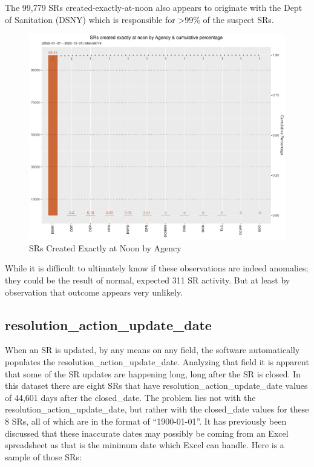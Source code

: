 \documentclass[12pt, titlepage]{article}
\begin{document}
{	The 99,779 SRs created-exactly-at-noon also appears to originate with the Dept of Sanitation (DSNY) which
	is responsible for \textgreater{}99\% of the suspect SRs.
	
	\begin{figure}[H]
		 \centering
		 \includegraphics[width = \textwidth]{created_at_noon_chart.pdf}
		 \caption{SRs Created Exactly at Noon by Agency}
		 \label{fig:noon-created}
	\end{figure}		
		
	While it is difficult to ultimately know if these observations are indeed anomalies; they could be the result of normal, expected
	311 SR activity. But at least by observation that outcome appears very unlikely.	
		
	\subsection{resolution\_action\_update\_date}
	When an SR is updated, by any means on any field, the software automatically populates the resolution\_action\_update\_date. Analyzing that field
	it is apparent that some of the SR updates are happening long, long after the SR is closed. In this dataset there are eight SRs that have 
	resolution\_action\_update\_date values of 44,601 days after the closed\_date. The problem lies not with the resolution\_action\_update\_date, but
	rather with the closed\_date values for these 8 SRs, all of which are in the format of ``1900-01-01''. It has previously been discussed that these
	inaccurate dates may possibly be coming from an Excel spreadsheet as that is the minimum date which Excel can handle. Here is a sample
	of those SRs:

}
\end{document}
